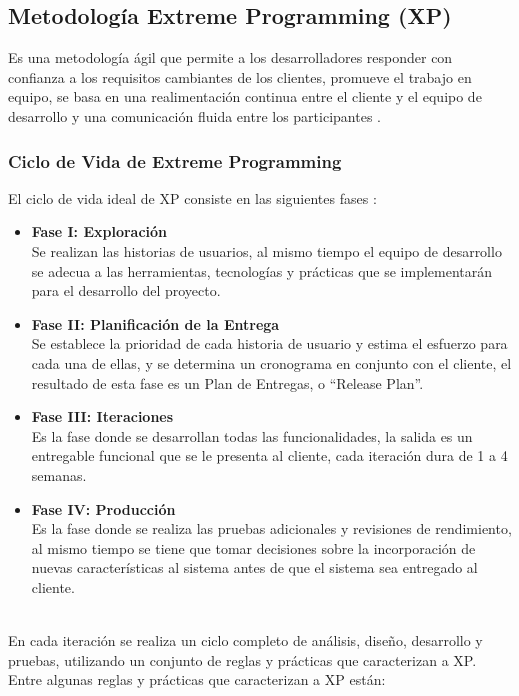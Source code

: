 \subsection{Metodología Extreme Programming (XP)}
Es una metodología ágil que permite a los desarrolladores responder con confianza a los requisitos cambiantes de los clientes, promueve el trabajo en equipo, se basa en una realimentación continua entre el cliente y el equipo de desarrollo y una comunicación fluida entre los participantes \cite{Canos2003}.

\subsubsection{Ciclo de Vida de Extreme Programming} 
El ciclo de vida ideal de XP consiste en las siguientes fases \cite{Joskowicz2014}:
\begin{itemize}
    \item \textbf{Fase I: Exploración} \ \\
Se realizan las historias de usuarios, al mismo tiempo el equipo de desarrollo se adecua a las herramientas, tecnologías y prácticas que se implementarán para el desarrollo del proyecto. 

 \item\textbf{Fase II: Planificación de la Entrega } \ \\
Se establece la prioridad de cada historia de usuario y estima el esfuerzo para cada una de ellas, y se determina un cronograma en conjunto con el cliente, el resultado de esta fase es un Plan de Entregas, o “Release Plan”.

 \item\textbf{Fase III: Iteraciones } \ \\
Es la fase donde se desarrollan todas las funcionalidades, la salida es un entregable funcional que se le presenta al cliente, cada iteración dura de 1 a 4 semanas.

 \item\textbf{Fase IV: Producción} \ \\
Es la fase donde se realiza las pruebas adicionales y revisiones de rendimiento, al mismo tiempo se tiene que tomar decisiones sobre la incorporación de nuevas características al sistema antes de que el sistema sea entregado al cliente.

\end{itemize}\ \\
En cada iteración se realiza un ciclo completo de análisis, diseño, desarrollo y pruebas, utilizando un conjunto de reglas y prácticas que caracterizan a XP. Entre algunas reglas y prácticas  que caracterizan a XP están:

